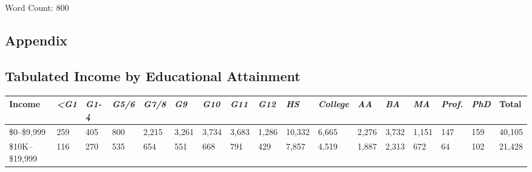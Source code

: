 \documentclass{article}
\begin{document}
Word Count: 800
\begin{landscape}

\thispagestyle{mylandscape}




\begin{table}[h]
\section*{Appendix}
\subsection*{Tabulated Income by Educational Attainment}
\begin{tabular}{|l|lllllllllllllll|l|}
\hline
\textbf{Income}    & \multicolumn{1}{l|}{\textit{\textless G1}} & \multicolumn{1}{l|}{\textit{G1-4}} & \multicolumn{1}{l|}{\textit{G5/6}} & \multicolumn{1}{l|}{\textit{G7/8}} & \multicolumn{1}{l|}{\textit{G9}} & \multicolumn{1}{l|}{\textit{G10}} & \multicolumn{1}{l|}{\textit{G11}} & \multicolumn{1}{l|}{\textit{G12}} & \multicolumn{1}{l|}{\textit{HS}} & \multicolumn{1}{l|}{\textit{College}} & \multicolumn{1}{l|}{\textit{AA}} & \multicolumn{1}{l|}{\textit{BA}} & \multicolumn{1}{l|}{\textit{MA}} & \multicolumn{1}{l|}{\textit{Prof.}} & \textit{PhD} & Total   \\ \hline
\$0--\$9,999       & 259                                        & 405                                 & 800                                & 2,215                              & 3,261                            & 3,734                             & 3,683                             & 1,286                             & 10,332                           & 6,665                                 & 2,276                            & 3,732                            & 1,151                            & 147                                 & 159          & 40,105  \\ \cline{1-1} \cline{17-17} 
\$10K--\$19,999 & 116                                        & 270                                 & 535                                & 654                                & 551                              & 668                               & 791                               & 429                               & 7,857                            & 4,519                                 & 1,887                            & 2,313                            & 672                              & 64                                  & 102          & 21,428  \\ \cline{1-1} \cline{17-17} 

\end{tabular}
\end{table}
\end{landscape}
\end{document}
